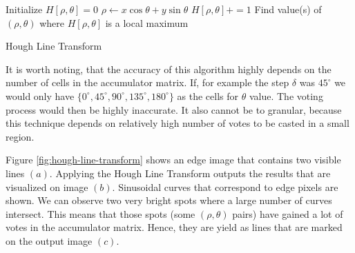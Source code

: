 \begin{algorithm}
	\begin{algorithmic}[1]
			\State Initialize $H[\rho, \theta] = 0$
					\State $\rho \gets x\cos\theta + y\sin\theta$
					\State $H[\rho, \theta] += 1$
				\EndFor
			\EndFor
			\State Find value(s) of $(\rho, \theta)$ where $H[\rho, \theta]$ is a local maximum
		\EndFunction
	\end{algorithmic}
	\caption{Hough Line Transform}
\end{algorithm}

\begin{note}
It is worth noting, that the accuracy of this algorithm highly depends on the number of cells in the accumulator matrix. If, for example the step $\delta$ was $45^{\circ}$ we would only have $\{0^{\circ}, 45^{\circ}, 90^{\circ}, 135^{\circ}, 180^{\circ}\}$ as the cells for $\theta$ value. The voting process would then be highly inaccurate. It also cannot be to granular, because this technique depends on relatively high number of votes to be casted in a small region.
\end{note}

Figure \ref{fig:hough-line-transform} shows an edge image that contains two visible lines $(a)$. Applying the Hough Line Transform outputs the results that are visualized on image $(b)$. Sinusoidal curves that correspond to edge pixels are shown. We can observe two very bright spots where a large number of curves intersect. This means that those spots (some $(\rho, \theta)$ pairs) have gained a lot of votes in the accumulator matrix. Hence, they are yield as lines that are marked on the output image $(c)$.

